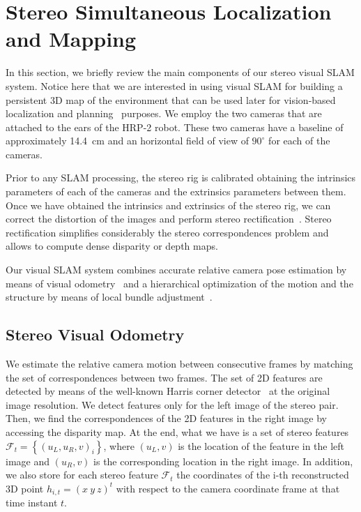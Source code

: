 \section{Stereo Simultaneous Localization and Mapping}\label{sec:vslam}
In this section, we briefly review the main components of our stereo
visual SLAM system. Notice here that we are interested in using visual
SLAM for building a persistent 3D map of the environment that can be
used later for vision-based localization and planning~ purposes. We employ the two cameras that are
attached to the ears of the HRP-2 robot. These two cameras have a
baseline of approximately 14.4~cm and an horizontal field of view of
$90^{\circ}$ for each of the cameras.

Prior to any SLAM processing, the stereo rig is calibrated obtaining
the intrinsics parameters of each of the cameras and the extrinsics
parameters between them. Once we have obtained the intrinsics and
extrinsics of the stereo rig, we can correct the distortion of the
images and perform stereo rectification~\citep{Hartley99ijcv}. Stereo
rectification simplifies considerably the stereo correspondences
problem and allows to compute dense disparity or depth maps.

Our visual SLAM system combines accurate relative camera pose
estimation by means of visual odometry~\cite{Kaess09icra} and a
hierarchical optimization of the motion and the structure by means of
local bundle adjustment~\cite{Mouragnon09ivc}.

\subsection{Stereo Visual Odometry}\label{sec:visual_odometry}

We estimate the relative camera motion between consecutive frames by
matching the set of correspondences between two frames. The set of 2D
features are detected by means of the well-known Harris corner
detector~\cite{Harris88avc} at the original image resolution. We
detect features only for the left image of the stereo pair. Then, we
find the correspondences of the 2D features in the right image by
accessing the disparity map. At the end, what we have is a set of
stereo features
$\mathcal{F}_{t}=\left\{\left(u_{L},u_{R},v\right)_{i}\right\}$, where
$\left(u_{L},v\right)$ is the location of the feature in the left
image and $\left(u_{R},v\right)$ is the corresponding location in the
right image. In addition, we also store for each stereo feature
$\mathcal{F}_{t}$ the coordinates of the i-th reconstructed 3D point
$h_{i,t}=\left(x \ y \ z\right)^{t}$ with respect to the camera
coordinate frame at that time instant $t$.


